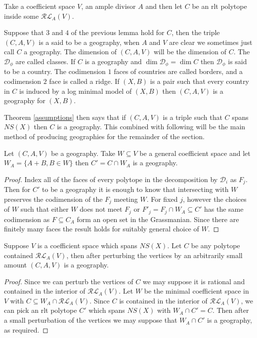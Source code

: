 	\begin{definition}
		Take a coefficient space $V$, an ample divisor $A$ and then let $C$ be an rlt polytope inside some $\mathcal{RL}_{A}(V)$.
		
		Suppose that $3$ and $4$ of the previous lemma hold for $C$, then the triple $(C,A,V)$ is a said to be a geography, when $A$ and $V$ are clear we sometimes just call $C$ a geography. The dimension of $(C,A,V)$ will be the dimension of $C$.
		The $\mathcal{D}_{\phi}$ are called classes.
		If $C$ is a geography and $\dim \mathcal{D_{\phi}}= \dim C$ then $\mathcal{D}_{\phi}$ is said to be a country. The codimension $1$ faces of countries are called borders, and a codimension $2$ face is called a ridge.
		If $(X,B)$ is a pair such that every country in $C$ is induced by a log minimal model of $(X,B)$ then $(C,A,V)$ is a geography for $(X,B)$.
	\end{definition}

	Theorem \ref{assumptions} then says that if $(C,A,V)$ is a triple such that $C$ spans $NS(X)$ then $C$ is a geography.
	This combined with following will be the main method of producing geographies for the remainder of the section.
	
	\begin{lemma}
		Let $(C,A,V)$ be a geography. Take $W \subseteq V$ be a general coefficient space and let $W_{A}=\{A+B, B \in W\}$ then $C'=C \cap W_{A}$ is a geography. 
	\end{lemma}
	\begin{proof}
		Index all of the faces of every polytope in the decomposition by $\mathcal{D}_{i}$ as $F_{j}$. Then for $C'$ to be a geography it is enough to know that intersecting with $W$ preserves the codimension of the $F_{j}$ meeting $W$. For fixed $j$, however the choices of $W$ such that either $W$ does not meet $F_{j}$ or $F'_{j}=F_{j} \cap W_{A} \subseteq C'$ has the same codimension as $F \subseteq C_{A}$ form an open set in the Grassmanian. Since there are finitely many faces the result holds for suitably general choice of $W$.
	\end{proof}

	

	\begin{lemma}
		Suppose $V$ is a coefficient space which spans $NS(X)$. Let $C$ be any polytope contained $\mathcal{RL}_{A}(V)$, then after perturbing the vertices by an arbitrarily small amount $(C,A,V)$ is a geography.
	\end{lemma}
	\begin{proof}
		Since we can perturb the vertices of $C$ we may suppose it is rational and contained in the interior of $\mathcal{RL}_{A}(V)$. Let $W$ be the minimal coefficient space in $V$ with $C \subseteq W_{A}\cap \mathcal{RL}_{A}(V)$. Since $C$ is contained in the interior of $\mathcal{RL}_{A}(V)$, we can pick an rlt polytope $C'$ which spans $NS(X)$ with $W_{A}\cap C'=C$. Then after a small perturbation of the vertices we may suppose that $W_{A}\cap C'$ is a geography, as required.
	\end{proof}

